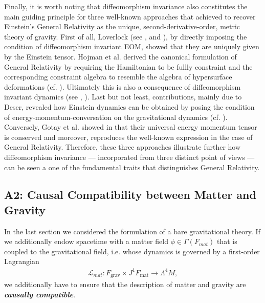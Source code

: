 \documentclass[%
 reprint,
nofootinbib,
 amsmath,amssymb,
 aps,
 prd,
floatfix,
]{revtex4-2}
\begin{document}
Finally, it is worth noting that diffeomorphism invariance also constitutes the main guiding principle for three well-known approaches that achieved to recover Einstein's General Relativity as the unique, second-derivative-order, metric theory of gravity. 
First of all, Loverlock (see \cite{Lovelock1969}, \cite{doi:10.1063/1.1665613} and \cite{doi:10.1063/1.1666069}), by directly imposing the condition of diffeomorphism invariant EOM, showed that they are uniquely given by the Einstein tensor.
Hojman et al. derived the canonical formulation of General Relativity by requiring the Hamiltonian to be fullly constraint and the corresponding constraint algebra to resemble the algebra of hypersurface deformations (cf. \cite{HOJMAN197688}).
Ultimately this is also a consequence of diffeomorphism invariant dynamics (see \cite{TobiMaster}, \cite{bojowald_2010}).
Last but not least, contributions, mainly due to Deser, revealed how Einstein dynamics can be obtained by posing the condition of energy-momentum-conversation on the gravitational dynamics (cf. \cite{1970GReGr...1....9D}).
Conversely, Gotay et al. showed in \cite{Gotay1992StressEnergyMomentumTA} that their universal energy momentum tensor is conserved and moreover, reproduces the well-known expression in the case of General Relativity.
Therefore, these three approaches illustrate further how diffeomorphism invariance --- incorporated from three distinct point of views --- can be seen a one of the fundamental traits that distinguishes General Relativity.

\subsection{A2: Causal Compatibility between Matter and Gravity}

In the last section we considered the formulation of a bare gravitational theory. If we additionally endow spacetime with a matter field $\phi \in  \Gamma(F_{mat})$ that is coupled to the gravitational field, i.e. whose dynamics is governed by a first-order Lagrangian
\begin{align}\label{matterL}
    \mathcal{L}_{mat} : F_\text{grav} \times J^1F_\text{mat} \longrightarrow \Lambda^4M,
\end{align}
we additionally have to ensure that the description of matter and gravity are \textit{\textbf{causally compatible}}.
\end{document}
